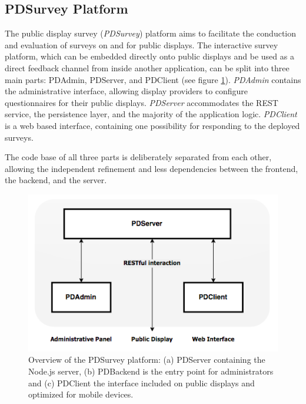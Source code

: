 

\subsection{PDSurvey Platform}

	The public display survey (\textit{PDSurvey}) platform aims to facilitate the conduction and evaluation of surveys on and for public displays. 
	The interactive survey platform, which can be embedded directly onto public displays and be used as a direct feedback channel from inside another application, can be split into three main parts: PDAdmin, PDServer, and PDClient (see figure \ref{fig:4-pdsurvey-platform}). \textit{PDAdmin} contains the administrative interface, allowing display providers to configure questionnaires for their public displays. \textit{PDServer} accommodates the REST service, the persistence layer, and the majority of the application logic. \textit{PDClient} is a web based interface, containing one possibility for responding to the deployed surveys. 

	The code base of all three parts is deliberately separated from each other, allowing the independent refinement and less dependencies between the frontend, the backend, and the server.




	\begin{figure}%
	    \begin{center}
	        \includegraphics[width=.7\columnwidth]{img/4_implementation/4-overview}
	    \end{center}
	 \caption[Overview of the PDSurvey platform]{Overview of the PDSurvey platform: (a) PDServer containing the Node.js server, (b) PDBackend is the entry point for administrators and (c) PDClient the interface included on public displays and optimized for mobile devices.}
	 \label{fig:4-pdsurvey-platform}
	\end{figure}




